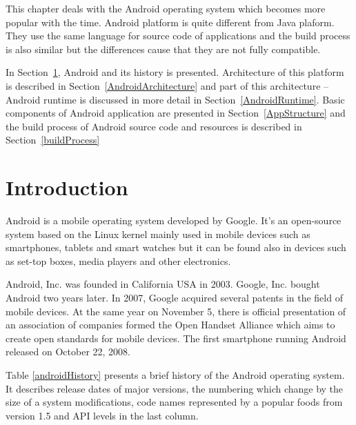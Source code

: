 This chapter deals with the Android operating system which becomes more popular with the time. Android platform is quite different from Java plaform. They use the same language for source code of applications and the build process is also similar but the differences cause that they are not fully compatible.

In Section~\ref{AndroidIntroduction}, Android and its history is presented. Architecture of this platform is described in Section~\ref{AndroidArchitecture} and part of this architecture -- Android runtime is discussed in more detail in Section~\ref{AndroidRuntime}. Basic components of Android application are presented in Section~\ref{AppStructure} and the build process of Android source code and resources is described in Section~\ref{buildProcess}

\section{Introduction}\label{AndroidIntroduction}
Android \cite{AndroidBook, AndroidProgBook} is a mobile operating system developed by Google. It's an open-source system based on the Linux kernel mainly used in mobile devices such as smartphones, tablets and smart watches but it can be found also in devices such as set-top boxes, media players and other electronics.

Android, Inc. was founded in California USA in 2003. Google, Inc. bought Android two years later. In 2007, Google acquired several patents in the field of mobile devices. At the same year on November 5, there is official presentation of an association of companies formed the Open Handset Alliance which aims to create open standards for mobile devices. The first smartphone running Android released on October 22, 2008.

Table \ref{androidHistory} presents a brief history of the Android operating system. It describes release dates of major versions, the numbering which change by the size of a system modifications, code names represented by a popular foods from version 1.5 and API levels in the last column.

